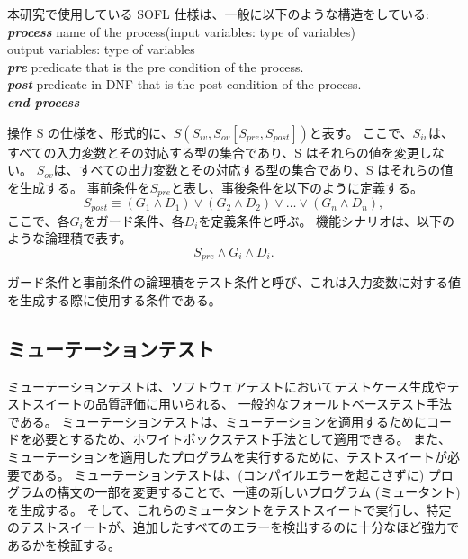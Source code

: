 \documentclass[uplatex, twocolumn, 10pt]{jsarticle} %
\begin{document}
本研究で使用している SOFL 仕様は、一般に以下のような構造をしている\cite{3}:\\

\textbf{\textit{process}} name of the process(input variables: type of variables)\\
output variables: type of variables\\

\textbf{\textit{pre}} predicate that is the pre condition of the process.\\

\textbf{\textit{post}} predicate in DNF that is the post condition of the process.\\

\textbf{\textit{end process}}

操作 S の仕様を、形式的に、$S(S_{iv}, S_{ov}[S_{pre}, S_{post}])$と表す。
ここで、$S_{iv}$は、すべての入力変数とその対応する型の集合であり、S はそれらの値を変更しない。
$S_{ov}$は、すべての出力変数とその対応する型の集合であり、S はそれらの値を生成する。
事前条件を$S_{pre}$と表し、事後条件を以下のように定義する。
\begin{equation*}
    S_{post} \equiv (G_1 \land D_1) \lor (G_2 \land D_2) \lor \dots \lor (G_n \land D_n),
\end{equation*}
ここで、各$G_i$をガード条件、各$D_i$を定義条件と呼ぶ。
機能シナリオは、以下のような論理積で表す。
\begin{equation*}
    S_{pre} \land G_i \land D_i.
\end{equation*}

ガード条件と事前条件の論理積をテスト条件と呼び、これは入力変数に対する値を生成する際に使用する条件である。

\subsection{ミューテーションテスト}
ミューテーションテストは、ソフトウェアテストにおいてテストケース生成やテストスイートの品質評価に用いられる、
一般的なフォールトベーステスト手法である。
ミューテーションテストは、ミューテーションを適用するためにコードを必要とするため、ホワイトボックステスト手法として適用できる。
また、ミューテーションを適用したプログラムを実行するために、テストスイートが必要である。
ミューテーションテストは、(コンパイルエラーを起こさずに) プログラムの構文の一部を変更することで、一連の新しいプログラム (ミュータント) を生成する。
そして、これらのミュータントをテストスイートで実行し、特定のテストスイートが、追加したすべてのエラーを検出するのに十分なほど強力であるかを検証する。
\end{document}
